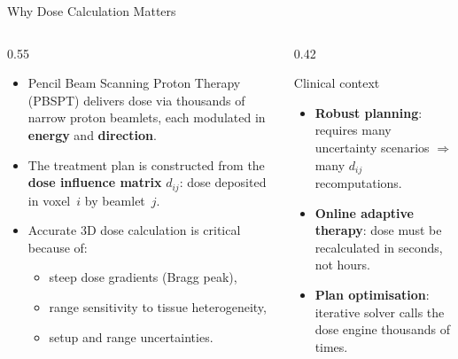 \documentclass[aspectratio=169, 10pt]{beamer}
\begin{document}
\begin{frame}{Why Dose Calculation Matters}
  \begin{columns}[T]
    \begin{column}{0.55\textwidth}
      \begin{itemize}\setlength{\itemsep}{4pt}
        \item Pencil Beam Scanning Proton Therapy (PBSPT) delivers dose
              via thousands of narrow proton beamlets, each modulated in
              \textbf{energy} and \textbf{direction}.
        \item The treatment plan is constructed from the \textbf{dose
              influence matrix} $d_{ij}$: dose deposited in voxel~$i$ by
              beamlet~$j$.
        \item Accurate 3D dose calculation is critical because of:
        \begin{itemize}
          \item steep dose gradients (Bragg peak),
          \item range sensitivity to tissue heterogeneity,
          \item setup and range uncertainties.
        \end{itemize}
      \end{itemize}
    \end{column}
    \begin{column}{0.42\textwidth}
      \begin{block}{Clinical context}
        \begin{itemize}\setlength{\itemsep}{2pt}
          \item \textbf{Robust planning}: requires many uncertainty
                scenarios $\Rightarrow$ many $d_{ij}$ recomputations.
          \item \textbf{Online adaptive therapy}: dose must be
                recalculated in seconds, not hours.
          \item \textbf{Plan optimisation}: iterative solver calls
                the dose engine thousands of times.
        \end{itemize}
      \end{block}
    \end{column}
  \end{columns}
\end{frame}
\end{document}
